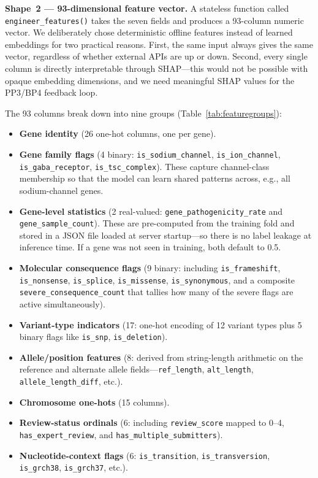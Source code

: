 \documentclass[12pt,a4paper]{article}
\begin{document}
\textbf{Shape~2 --- 93-dimensional feature vector.}
A stateless function called \texttt{engineer\_features()} takes
the seven fields and produces a 93-column numeric vector. We
deliberately chose deterministic offline features instead of
learned embeddings for two practical reasons. First, the same
input always gives the same vector, regardless of whether external
APIs are up or down. Second, every single column is directly
interpretable through SHAP---this would not be possible with
opaque embedding dimensions, and we need meaningful SHAP values
for the PP3/BP4 feedback loop.

The 93 columns break down into nine groups
(Table~\ref{tab:featuregroups}):

\begin{itemize}
  \item \textbf{Gene identity} (26 one-hot columns, one per gene).
  \item \textbf{Gene family flags} (4 binary:
        \texttt{is\_sodium\_channel}, \texttt{is\_ion\_channel},
        \texttt{is\_gaba\_receptor}, \texttt{is\_tsc\_complex}).
        These capture channel-class membership so that the model
        can learn shared patterns across, e.g., all sodium-channel
        genes.
  \item \textbf{Gene-level statistics} (2 real-valued:
        \texttt{gene\_pathogenicity\_rate} and
        \texttt{gene\_sample\_count}). These are pre-computed from
        the training fold and stored in a JSON file loaded at
        server startup---so there is no label leakage at inference
        time. If a gene was not seen in training, both default
        to 0.5.
  \item \textbf{Molecular consequence flags} (9 binary: including
        \texttt{is\_frameshift}, \texttt{is\_nonsense},
        \texttt{is\_splice}, \texttt{is\_missense},
        \texttt{is\_synonymous}, and a composite
        \texttt{severe\_consequence\_count} that tallies how many
        of the severe flags are active simultaneously).
  \item \textbf{Variant-type indicators} (17: one-hot encoding of
        12 variant types plus 5 binary flags like \texttt{is\_snp},
        \texttt{is\_deletion}).
  \item \textbf{Allele/position features} (8: derived from
        string-length arithmetic on the reference and alternate
        allele fields---\texttt{ref\_length}, \texttt{alt\_length},
        \texttt{allele\_length\_diff}, etc.).
  \item \textbf{Chromosome one-hots} (15 columns).
  \item \textbf{Review-status ordinals} (6: including
        \texttt{review\_score} mapped to 0--4,
        \texttt{has\_expert\_review}, and
        \texttt{has\_multiple\_submitters}).
  \item \textbf{Nucleotide-context flags} (6:
        \texttt{is\_transition}, \texttt{is\_transversion},
        \texttt{is\_grch38}, \texttt{is\_grch37}, etc.).
\end{itemize}
\end{document}

